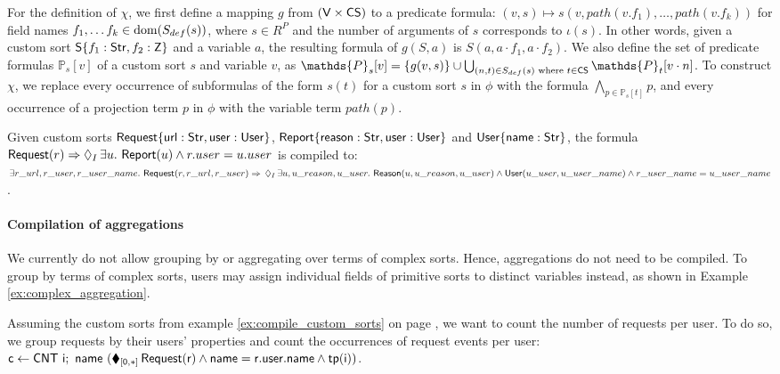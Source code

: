 For the definition of $\chi$, we first define a mapping $g$ from $(\mathsf{V} \times \mathsf{CS})$ to a predicate formula: $(v, s) \mapsto s\left(v, path(v.f_1), \dots, path(v.f_k)\right)$ for field names $f_1, \dots f_k \in \operatorname{dom}(S_{def}(s))$, where $s \in R^P$ and the number of arguments of $s$ corresponds to $\iota(s)$. In other words, given a custom sort $\mathsf{S} \{ f_1 : \mathsf{Str}, f_2 : \mathsf{Z} \}$ and a variable $a$, the resulting formula of $g(S, a)$ is $S(a, a \cdot f_1, a \cdot f_2)$. We also define the set of predicate formulas $\mathds{P}_s[v]$ of a custom sort $s$ and variable $v$, as $\mathds{P}_s[v] = \left\{ g(v, s) \right\} \cup \bigcup_{(n, t) \in S_{def}(s) \text{ where } t \in \mfodlCustomSorts} \mathds{P}_t[v \cdot n]$. To construct $\chi$, we replace every occurrence of subformulas of the form $s(t)$ for a custom sort $s$ in $\phi$ with the formula $\bigwedge_{p \in \mathds{P}_s[t]} p$, and every occurrence of a projection term $p$ in $\phi$ with the variable term $path(p)$.
\begin{example}
	\label{ex:compile_custom_sorts}
	Given custom sorts $\mathsf{Request}\{ \mathsf{url} : \mathsf{Str}, \mathsf{user} : \mathsf{User} \}$, $\mathsf{Report}\{ \mathsf{reason} : \mathsf{Str}, \mathsf{user} : \mathsf{User} \}$ and $\mathsf{User} \{ \mathsf{name} : \mathsf{Str} \}$,
	the formula\\
	$\mathsf{Request}(r) \Rightarrow \operatorname{\lozenge}_I \exists u .\ \mathsf{Report}(u) \land r.user = u.user$ is compiled to: \\
	$\exists r\_url, r\_user, r\_user\_name .\ \mathsf{Request}(r, r\_url, r\_user) \Rightarrow \\
		\mfodlEventually_I \exists u, u\_reason, u\_user .\ \mathsf{Reason}(u, u\_reason, u\_user) \land \\
		\mathsf{User}(u\_user, u\_user\_name) \land r\_user\_name = u\_user\_name $.
\end{example}

\paragraph{Compilation of aggregations}
We currently do not allow grouping by or aggregating over terms of complex sorts. Hence, aggregations do not need to be compiled. To group by terms of complex sorts, users may assign individual fields of primitive sorts to distinct variables instead, as shown in Example \ref{ex:complex_aggregation}.

\begin{example}
	\label{ex:complex_aggregation}
	Assuming the custom sorts from example \ref{ex:compile_custom_sorts} on page \pageref{ex:compile_custom_sorts}, we want to count the number of requests per user. To do so, we group requests by their users' properties and count the occurrences of request events per user: $\mathsf{c \leftarrow CNT\ i;\ name\ (\operatorname{\blacklozenge}_{[0,*]} Request(r) \land name = r.user.name \land tp(i))}$.

\end{example}


